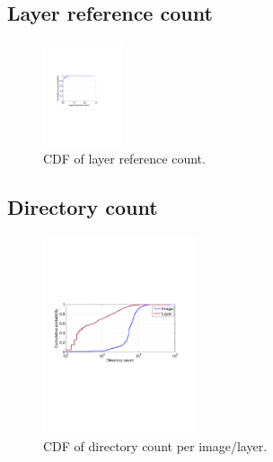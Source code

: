\subsection{Layer reference count}

\begin{figure}
	\centering
	\includegraphics[width=0.21\textwidth]{graphs/shared-cnt-cdf.pdf}
	\caption{CDF of layer reference count.
	}
	\label{fig:reference-cnt}
\end{figure}

\subsection{Directory count}
\begin{figure}
	\centering
	\includegraphics[width=0.4\textwidth]{graphs/dir-cnt-cdf.pdf}
	\caption{CDF of directory count per image/layer.
	}
	\label{fig:reference-cnt}
\end{figure}

